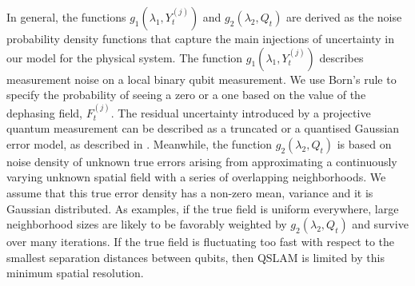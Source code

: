 In general, the functions $g_1(\lambda_1, Y_t^{(j)})$ and $g_2(\lambda_2, Q_t)$ are derived as the noise probability density functions that capture the main injections of uncertainty in our model for the physical system. The function $g_1(\lambda_1, Y_t^{(j)})$ describes measurement noise on a local binary qubit measurement. We use Born's rule to specify the probability of seeing a zero or a one based on the value of the dephasing field, $F_t^{(j)}$. The residual uncertainty introduced by a projective quantum measurement can be described as a truncated or a quantised Gaussian error model, as described in \cite{riddhinotes}. Meanwhile, the function $g_2(\lambda_2, Q_t)$ is based on noise density of unknown true errors arising from approximating a continuously varying unknown spatial field with a series of overlapping neighborhoods. We assume that this true error density has a non-zero mean, variance and it is Gaussian distributed. As examples, if the true field is uniform everywhere, large neighborhood sizes are likely to be favorably weighted by  $g_2(\lambda_2, Q_t)$ and survive over many iterations. If the true field is fluctuating too fast  with respect to the smallest separation distances between qubits, then QSLAM is limited by this minimum spatial resolution. %

